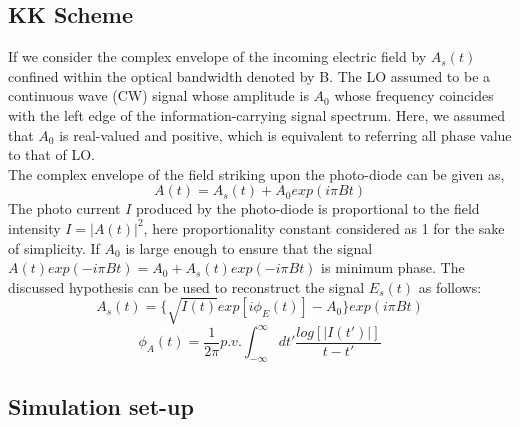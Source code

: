\subsection{KK Scheme}
If we consider the complex envelope of the incoming electric field by $A_s(t)$ confined within the optical bandwidth denoted by B. The LO assumed to be a continuous wave (CW) signal whose amplitude is $A_0$ whose frequency coincides with the left edge of the information-carrying signal spectrum. Here, we assumed that $A_0$ is real-valued and positive, which is equivalent to referring all phase value to that of LO.\\
The complex envelope of the field striking upon the photo-diode can be given as,
\begin{equation}
A(t)=A_s(t)+A_0 exp(i\pi Bt)
\end{equation}
The photo current $I$ produced by the photo-diode is proportional to the field intensity $I=|A(t)|^2$, here proportionality constant considered as 1 for the sake of simplicity. If $A_0$ is large enough to ensure that the signal $A(t)exp(-i\pi Bt)=A_0+A_s(t)exp(-i\pi Bt)$ is minimum phase. The discussed hypothesis can be used to reconstruct the signal $E_s(t)$ as follows:
\begin{equation}
A_s(t)=\{\sqrt{I(t)} exp[i\phi_E(t)]-A_0\} exp(i\pi Bt)
\end{equation}
\begin{equation}
\phi_A(t)=\dfrac{1}{2\pi} p.v. \int_{-\infty}^{\infty} dt' \frac{log[|I(t')|]}{t-t'}
\label{Eq:5.19}
\end{equation}

\subsection{Simulation set-up}

